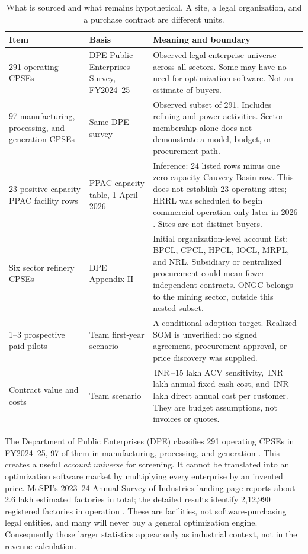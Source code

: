 \documentclass[11pt,a4paper]{article}
\newcommand{\inr}{\ifmmode\text{INR}\,\else INR\,\fi}
\newcommand{\lac}{\ifmmode\,\text{lakh}\else\,lakh\fi}
\begin{document}
\begin{table}[htbp]
\centering
\caption{What is sourced and what remains hypothetical. A site, a legal organization, and a purchase contract are different units.}
\label{tab:evidence}
\small
\begin{tabularx}{\textwidth}{@{}p{35mm}p{34mm}X@{}}
\toprule
Item & Basis & Meaning and boundary\\
\midrule
291 operating CPSEs & DPE Public Enterprises Survey, FY2024--25 \cite{dpe2025} & Observed legal-enterprise universe across all sectors. Some may have no need for optimization software. Not an estimate of buyers.\\
97 manufacturing, processing, and generation CPSEs & Same DPE survey \cite{dpe2025} & Observed subset of 291. Includes refining and power activities. Sector membership alone does not demonstrate a model, budget, or procurement path.\\
23 positive-capacity PPAC facility rows & PPAC capacity table, 1 April 2026 \cite{ppac2026} & Inference: 24 listed rows minus one zero-capacity Cauvery Basin row. This does not establish 23 operating sites; HRRL was scheduled to begin commercial operation only later in 2026 \cite{hrrl2026}. Sites are not distinct buyers.\\
Six sector refinery CPSEs & DPE Appendix II \cite{dpeappendix} & Initial organization-level account list: BPCL, CPCL, HPCL, IOCL, MRPL, and NRL. Subsidiary or centralized procurement could mean fewer independent contracts. ONGC belongs to the mining sector, outside this nested subset.\\
1--3 prospective paid pilots & Team first-year scenario & A conditional adoption target. Realized SOM is unverified: no signed agreement, procurement approval, or price discovery was supplied.\\
Contract value and costs & Team scenario & \inr5--15\lac{} ACV sensitivity, \inr60\lac{} annual fixed cash cost, and \inr3\lac{} direct annual cost per customer. They are budget assumptions, not invoices or quotes.\\
\bottomrule
\end{tabularx}
\end{table}

The Department of Public Enterprises (DPE) classifies 291 operating CPSEs in FY2024--25, 97 of them in manufacturing, processing, and generation \cite{dpe2025}. This creates a useful \emph{account universe} for screening. It cannot be translated into an optimization software market by multiplying every enterprise by an invented price. MoSPI's 2023--24 Annual Survey of Industries landing page reports about 2.6 lakh estimated factories in total; the detailed results identify 2,12,990 registered factories in operation \cite{asi2024,asisummary}. These are facilities, not software-purchasing legal entities, and many will never buy a general optimization engine. Consequently those larger statistics appear only as industrial context, not in the revenue calculation.
\end{document}
